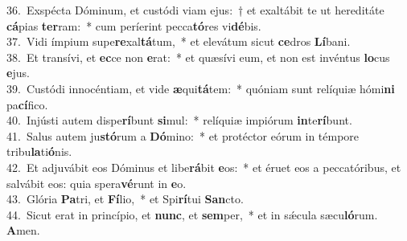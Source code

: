 {36.~}Exspécta Dóminum, et custódi viam ejus:~† et exaltábit te ut hereditáte \textbf{cá}pias \textbf{ter}ram:~* cum períerint pecca\textbf{tó}res vi\textbf{dé}bis.\\
{37.~}Vidi ímpium supe\textbf{re}xal\textbf{tá}tum,~* et elevátum sicut \textbf{ce}dros \textbf{Lí}bani.\\
{38.~}Et transívi, et \textbf{ec}ce non \textbf{e}rat:~* et quæsívi eum, et non est invéntus \textbf{lo}cus \textbf{e}jus.\\
{39.~}Custódi innocéntiam, et vide \textbf{æ}qui\textbf{tá}tem:~* quóniam sunt relíquiæ hómi\textbf{ni} pa\textbf{cí}fico.\\
{40.~}Injústi autem dispe\textbf{rí}bunt \textbf{si}mul:~* relíquiæ impiórum \textbf{in}te\textbf{rí}bunt.\\
{41.~}Salus autem ju\textbf{stó}rum a \textbf{Dó}mino:~* et protéctor eórum in témpore tribu\textbf{la}ti\textbf{ó}nis.\\
{42.~}Et adjuvábit eos Dóminus et libe\textbf{rá}bit \textbf{e}os:~* et éruet eos a peccatóribus, et salvábit eos: quia spera\textbf{vé}runt in \textbf{e}o.\\
{43.~}Glória \textbf{Pa}tri, et \textbf{Fí}lio,~* et Spi\textbf{rí}tui \textbf{San}cto.\\
{44.~}Sicut erat in princípio, et \textbf{nunc}, et \textbf{sem}per,~* et in sǽcula sæcu\textbf{ló}rum. \textbf{A}men.\\
